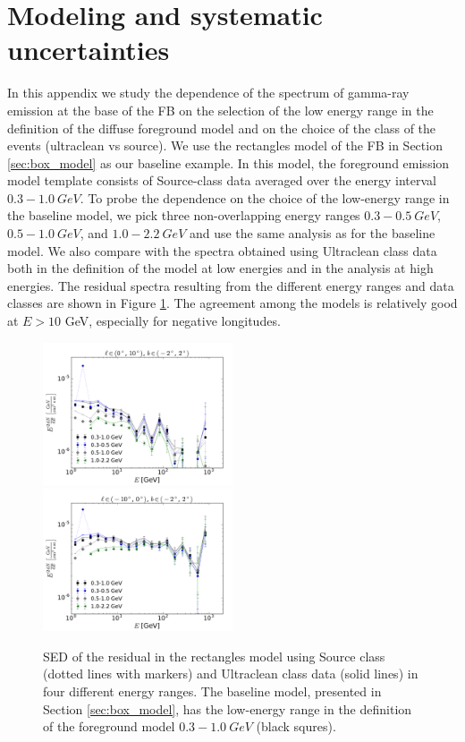 \section{Modeling and systematic uncertainties}

In this appendix we study the dependence of the spectrum of gamma-ray emission at the base of the FB
on the selection of the low energy range in the definition of the diffuse foreground model
and on the choice of the class of the events (ultraclean vs source).
We use the rectangles model of the FB in Section \ref{sec:box_model}
as our baseline example.
In this model, the foreground emission model template consists of Source-class data averaged over the energy interval $0.3 - \SI{1.0}{GeV}$. 
To probe the dependence on the choice of the low-energy range in the baseline model, 
we pick three non-overlapping energy ranges $0.3 - \SI{0.5}{GeV}$, $0.5 - \SI{1.0}{GeV}$, and $1.0 - \SI{2.2}{GeV}$ 
and use the same analysis as for the baseline model. 
We also compare with the spectra obtained using Ultraclean class data both in the definition of the model
at low energies and in the analysis at high energies.
The residual spectra resulting from the different energy ranges and data classes are shown in Figure \ref{fig:syst_models}. 
The agreement among the models is relatively good at $E > 10$ GeV, especially for negative longitudes.

\begin{figure}[h]
\includegraphics[width=0.5\textwidth]{plots/SED_different_lowE_ranges_boxes_l=5_b=0.pdf}
\includegraphics[width=0.5\textwidth]{plots/SED_different_lowE_ranges_boxes_l=-5_b=0.pdf}
\caption{SED of the residual in the rectangles model using Source class (dotted lines with markers) and Ultraclean class data (solid lines) in four different energy ranges. The baseline model, presented in Section \ref{sec:box_model}, has the low-energy range in the definition of the foreground model
$0.3 - \SI{1.0}{GeV}$ (black squres).}
\label{fig:syst_models}
\end{figure}